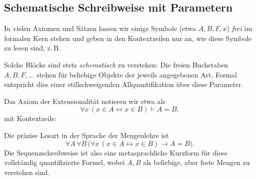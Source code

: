 \documentclass[main.tex]{subfiles}
\begin{document}
\subsection{Schematische Schreibweise mit Parametern}

In vielen Axiomen und Sätzen lassen wir einige Symbole (etwa \(A,B,F,x\))
\emph{frei} im formalen Kern stehen und geben in den Kontextzeilen
nur an, wie diese Symbole zu lesen sind, z.\,B.

\leavevmode\newline
Solche Blöcke sind stets \emph{schematisch} zu verstehen: Die freien
Buchstaben \(A,B,F,\dots\) stehen für beliebige Objekte der jeweils
angegebenen Art. Formal entspricht dies einer stillschweigenden
Allquantifikation über diese Parameter.

\begin{example}[Extensionalität]
Das Axiom der Extensionalität notieren wir etwa als
\[
  \forall x\,(x \in A \leftrightarrow x \in B) \vdash A = B,
\]
mit Kontextzeile:

\leavevmode\newline
Die präzise Lesart in der Sprache der Mengenlehre ist
\[
  \forall A\,\forall B\,
    \bigl( \forall x\,(x \in A \leftrightarrow x \in B)
           \rightarrow A = B \bigr).
\]
Die Sequenzschreibweise ist also eine metasprachliche Kurzform
für diese vollständig quantifizierte Formel, wobei \(A,B\) als
beliebige, aber feste Mengen zu verstehen sind.
\end{example}
\end{document}
